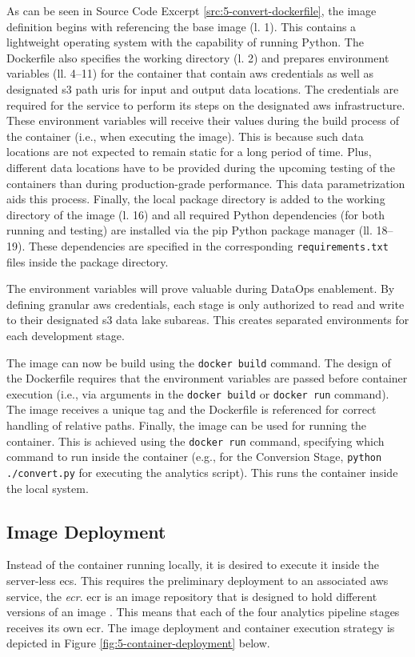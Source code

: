 As can be seen in Source Code Excerpt \ref{src:5-convert-dockerfile}, the image definition begins with referencing the base image (l. 1). This contains a lightweight operating system with the capability of running Python. The Dockerfile also specifies the working directory (l. 2) and prepares environment variables (ll. 4--11) for the container that contain \ac{aws} credentials as well as designated \ac{s3} path \acp{uri} for input and output data locations. The credentials are required for the service to perform its steps on the designated \ac{aws} infrastructure. These environment variables will receive their values during the build process of the container (i.e., when executing the image). This is because such data locations are not expected to remain static for a long period of time. Plus, different data locations have to be provided during the upcoming testing of the containers than during production-grade performance. This data parametrization aids this process. Finally, the local package directory is added to the working directory of the image (l. 16) and all required Python dependencies (for both running and testing) are installed via the \acs{pip} Python package manager (ll. 18--19). These dependencies are specified in the corresponding \texttt{requirements.txt} files inside the package directory.

The environment variables will prove valuable during DataOps enablement. By defining granular \ac{aws} credentials, each stage is only authorized to read and write to their designated \ac{s3} data lake subareas. This creates separated environments for each development stage.

The image can now be build using the \texttt{docker build} command. The design of the Dockerfile requires that the environment variables are passed before container execution (i.e., via arguments in the \texttt{docker build} or \texttt{docker run} command). The image receives a unique tag and the Dockerfile is referenced for correct handling of relative paths. Finally, the image can be used for running the container. This is achieved using the \texttt{docker run} command, specifying which command to run inside the container (e.g., for the Conversion Stage, \texttt{python ./convert.py} for executing the analytics script). This runs the container inside the local system.

\subsection{Image Deployment}
Instead of the container running locally, it is desired to execute it inside the server-less \ac{ecs}. This requires the preliminary deployment to an associated \ac{aws} service, the \textit{\ac{ecr}}. \ac{ecr} is an image repository that is designed to hold different versions of an image \cite{ecr}. This means that each of the four analytics pipeline stages receives its own \ac{ecr}. The image deployment and container execution strategy is depicted in Figure \ref{fig:5-container-deployment} below.

